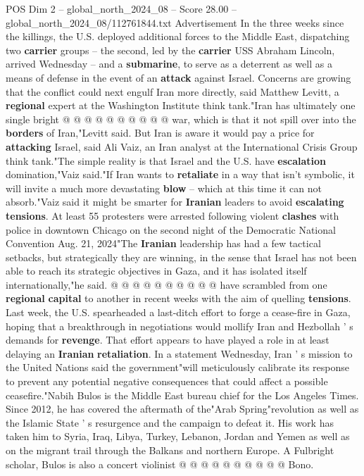 \begin{textsample}{POS Dim 2 – global\_north\_2024\_08 – Score 28.00 – global\_north\_2024\_08/112761844.txt}
Advertisement In the three weeks since the killings, the U.S. deployed additional forces to the Middle East, dispatching two \textbf{carrier} groups -- the second, led by the \textbf{carrier} USS Abraham Lincoln, arrived Wednesday -- and a \textbf{submarine}, to serve as a deterrent as well as a means of defense in the event of an \textbf{attack} against Israel.
Concerns are growing that the conflict could next engulf Iran more directly, said Matthew Levitt, a \textbf{regional} expert at the Washington Institute think tank."Iran has ultimately one single bright @ @ @ @ @ @ @ @ @ @ war, which is that it not spill over into the \textbf{borders} of Iran,"Levitt said.
But Iran is aware it would pay a price for \textbf{attacking} Israel, said Ali Vaiz, an Iran analyst at the International Crisis Group think tank."The simple reality is that Israel and the U.S. have \textbf{escalation} domination,"Vaiz said."If Iran wants to \textbf{retaliate} in a way that isn't symbolic, it will invite a much more devastating \textbf{blow} -- which at this time it can not absorb."Vaiz said it might be smarter for \textbf{Iranian} leaders to avoid \textbf{escalating} \textbf{tensions}.
At least 55 protesters were arrested following violent \textbf{clashes} with police in downtown Chicago on the second night of the Democratic National Convention Aug. 21, 2024"The \textbf{Iranian} leadership has had a few tactical setbacks, but strategically they are winning, in the sense that Israel has not been able to reach its strategic objectives in Gaza, and it has isolated itself internationally,"he said. @ @ @ @ @ @ @ @ @ @ have scrambled from one \textbf{regional} \textbf{capital} to another in recent weeks with the aim of quelling \textbf{tensions}.
Last week, the U.S. spearheaded a last-ditch effort to forge a cease-fire in Gaza, hoping that a breakthrough in negotiations would mollify Iran and Hezbollah ' s demands for \textbf{revenge}.
That effort appears to have played a role in at least delaying an \textbf{Iranian} \textbf{retaliation}.
In a statement Wednesday, Iran ' s mission to the United Nations said the government"will meticulously calibrate its response to prevent any potential negative consequences that could affect a possible ceasefire."Nabih Bulos is the Middle East bureau chief for the Los Angeles Times.
Since 2012, he has covered the aftermath of the"Arab Spring"revolution as well as the Islamic State ' s resurgence and the campaign to defeat it.
His work has taken him to Syria, Iraq, Libya, Turkey, Lebanon, Jordan and Yemen as well as on the migrant trail through the Balkans and northern Europe.
A Fulbright scholar, Bulos is also a concert violinist @ @ @ @ @ @ @ @ @ @ Bono.

\end{textsample}
